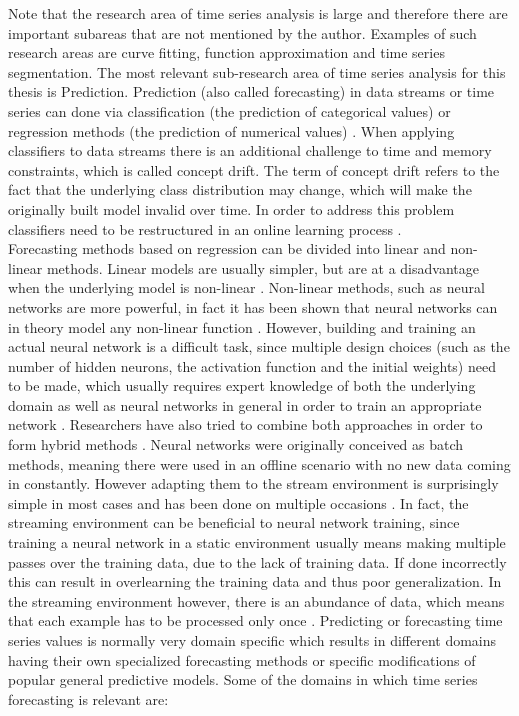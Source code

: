 Note that the research area of time series analysis is large and therefore there are important subareas that are not mentioned by the author. Examples of such research areas are curve fitting, function approximation and time series segmentation. The most relevant sub-research area of time series analysis for this thesis is Prediction. Prediction (also called forecasting) in data streams or time series can done via classification (the prediction of categorical values) \cite{leung2000forecasting} or regression methods (the prediction of numerical values) \cite{alzghoul2012data}. When applying classifiers to data streams there is an additional challenge to time and memory constraints, which is called concept drift. The term of concept drift refers to the fact that the underlying class distribution may change, which will make the originally built model invalid over time. In order to address this problem classifiers need to be restructured in an online learning process \cite{wang2003mining}. \\
Forecasting methods based on regression can be divided into linear and non-linear methods. Linear models are usually simpler, but are at a disadvantage when the underlying model is non-linear \cite{zhang2003time}. Non-linear methods, such as neural networks are more powerful, in fact it has been shown that neural networks can in theory model any non-linear function \cite{abraham2005artificial} \cite{funahashi1989approximate}. However, building and training an actual neural network is a difficult task, since multiple design choices (such as the number of hidden neurons, the activation function and the initial weights) need to be made, which usually requires expert knowledge of both the underlying domain as well as neural networks in general in order to train an appropriate network \cite{abraham2005artificial}. Researchers have also tried to combine both approaches in order to form hybrid methods \cite{zhang2003time}. \newline
Neural networks were originally conceived as batch methods, meaning there were used in an offline scenario with no new data coming in constantly. However adapting them to the stream environment is surprisingly simple in most cases and has been done on multiple occasions \cite{chang2002real} \cite{frank2001time}. In fact, the streaming environment can be beneficial to neural network training, since training a neural network in a static environment usually means making multiple passes over the training data, due to the lack of training data. If done incorrectly this can result in overlearning the training data and thus poor generalization. In the streaming environment however, there is an abundance of data, which means that each example has to be processed only once \cite{gama2010knowledge}. \newline
Predicting or forecasting time series values is normally very domain specific which results in different domains having their own specialized forecasting methods or specific modifications of popular general predictive models. Some of the domains in which time series forecasting is relevant are:

